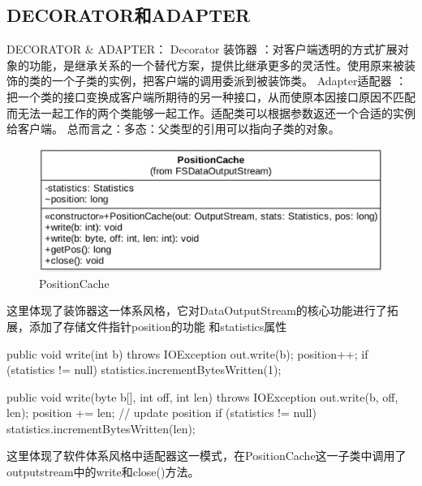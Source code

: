 \subsection{DECORATOR和ADAPTER}

DECORATOR \& ADAPTER：
Decorator 装饰器 ：对客户端透明的方式扩展对象的功能，是继承关系的一个替代方案，提供比继承更多的灵活性。使用原来被装饰的类的一个子类的实例，把客户端的调用委派到被装饰类。
Adapter适配器 ：把一个类的接口变换成客户端所期待的另一种接口，从而使原本因接口原因不匹配而无法一起工作的两个类能够一起工作。适配类可以根据参数返还一个合适的实例给客户端。
总而言之：多态：父类型的引用可以指向子类的对象。
\begin{figure}[h]
\centering
\includegraphics[width =1\linewidth]{positioncache.png}
\caption{PositionCache}
\label{fig:sa:PositionCache}
\end{figure}
这里体现了装饰器这一体系风格，它对DataOutputStream的核心功能进行了拓展，添加了存储文件指针position的功能
和statistics属性
\begin{java}
public void write(int b) throws IOException {
  out.write(b);
  position++;
  if (statistics != null) {
    statistics.incrementBytesWritten(1);
  }
}

public void write(byte b[], int off, int len) throws IOException {
  out.write(b, off, len);
  position += len;                            // update position
  if (statistics != null) {
    statistics.incrementBytesWritten(len);
  }
}
\end{java}
这里体现了软件体系风格中适配器这一模式，在PositionCache这一子类中调用了outputstream中的write和close()方法。


\endinput
